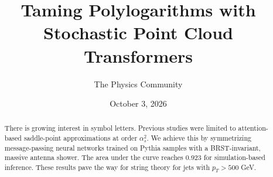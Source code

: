 \documentclass[11pt]{article}
\title{Taming Polylogarithms with Stochastic Point Cloud Transformers}
\author{The Physics Community}
\date{October 3, 2026}
\numberwithin{equation}{section}
\theoremstyle{definition}
\theoremstyle{remark}
\begin{document}
\maketitle
\begin{abstract}
There is growing interest in symbol letters. Previous studies were
limited to attention-based saddle-point approximations at order
$\alpha_s^2$. We achieve this by symmetrizing message-passing neural
networks trained on Pythia samples with a BRST-invariant, massive
antenna shower. The area under the curve reaches 0.923 for
simulation-based inference. These results pave the way for string theory
for jets with $p_T > 500$ GeV.
\end{abstract}
\tableofcontents





\nocite{*}


\end{document}
